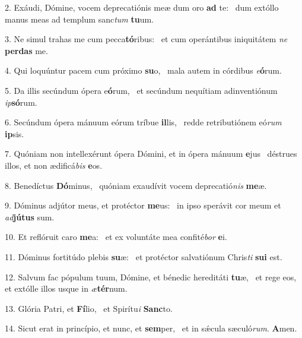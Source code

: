 2. Exáudi, Dómine, vocem deprecatiónis meæ dum oro \textbf{ad} te: \ast\  dum extóllo manus meas ad templum sanc\textit{tum} \textbf{tu}um.\

3. Ne simul trahas me cum pecca\textbf{tó}ribus: \ast\  et cum operántibus iniquitátem \textit{ne} \textbf{per}\textbf{das} me.\

4. Qui loquúntur pacem cum próximo \textbf{su}o, \ast\  mala autem in córdibus \textit{e}\textbf{ó}rum.\

5. Da illis secúndum ópera e\textbf{ó}rum, \ast\  et secúndum nequítiam adinventiónum \textit{ip}\textbf{só}rum.\

6. Secúndum ópera mánuum eórum tríbue \textbf{il}lis, \ast\  redde retributiónem eó\textit{rum} \textbf{ip}sis.\

7. Quóniam non intellexérunt ópera Dómini, et in ópera mánuum \textbf{e}jus \ast\  déstrues illos, et non ædificá\textit{bis} \textbf{e}os.\

8. Benedíctus \textbf{Dó}minus, \ast\  quóniam exaudívit vocem deprecatió\textit{nis} \textbf{me}æ.\

9. Dóminus adjútor meus, et protéctor \textbf{me}us: \ast\  in ipso sperávit cor meum et \textit{ad}\textbf{jú}\textbf{tus} sum.\

10. Et reflóruit caro \textbf{me}a: \ast\  et ex voluntáte mea confité\textit{bor} \textbf{e}i.\

11. Dóminus fortitúdo plebis \textbf{su}æ: \ast\  et protéctor salvatiónum Chris\textit{ti} \textbf{su}\textbf{i} est.\

12. Salvum fac pópulum tuum, Dómine, et bénedic hereditáti \textbf{tu}æ, \ast\  et rege eos, et extólle illos usque in \textit{æ}\textbf{tér}num.\

13. Glória Patri, et \textbf{Fí}lio, \ast\  et Spirítu\textit{i} \textbf{Sanc}to.\

14. Sicut erat in princípio, et nunc, et \textbf{sem}per, \ast\  et in sǽcula sæculó\textit{rum}. \textbf{A}men.\

